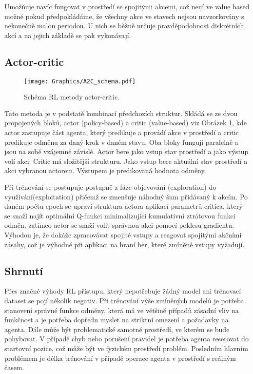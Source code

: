 \documentclass[czech, bc, kky, he, iso690alph]{fasthesis}
\begin{document}
	            Umožňuje navíc fungovat v prostředí se spojitými akcemi, což není ve value based možné pokud předpokládáme, že všechny akce ve stavech nejsou navzorkovány s nekonečně malou periodou. U nich se běžně určuje pravděpodobnost diskrétních akcí a na jejich základě se pak vykonávají.
            
            \subsection{Actor-critic}
            		
            		\begin{figure}[h]
            			\centering
            			\texttt{[image: Graphics/A2C\_schema.pdf]}
            			\caption{Schéma RL metody actor-critic.}
            			\label{pic:actor_critic}
            		\end{figure}
            		
	            Tato metoda je v podstatě kombinací předchozích struktur. Skládá se ze dvou propojených bloků, actor (policy-based) a critic (value-based) viz Obrázek \ref{pic:actor_critic}, kde actor zastupuje část agenta, který predikuje a provádí akce v prostředí a critic predikuje odměnu za daný krok v daném stavu. Oba bloky fungují paralelně a jsou na sobě vzájemně závislé. Actor bere jako vstup stav prostředí a jako výstup volí akci. Critic má složitější strukturu. Jako vstup bere aktuální stav prostředí a akci vybranou actorem. Výstupem je predikovaná hodnota odměny.
	            
	            Při trénování se postupuje postupně z fáze objevování (exploration) do využívání(exploitation) přičemž se zmenšuje náhodný šum přidávaný k akcím. Po daném počtu epoch se upraví struktura actora aplikací parametrů critica, který se snaží najít optimální Q-funkci minimalizující kumulativní ztrátovou funkci odměn, zatímco actor se snaží volit správnou akci pomocí poklesu gradientu. Výhodou je, že dokáže zpracovávat spojité vstupy a reagovat spojitými akčními zásahy, což je výhodné při aplikaci na hraní her, které zmíněné vstupy vyžadují.
	            
        	\subsection{Shrnutí}
        		Přes značné výhody RL přístupu, který nepotřebuje žádný model ani trénovací dataset se pojí několik negativ. Při trénování výše zmíněných modelů je potřeba stanovení správné funkce odměny, která má ve většině případů zásadní vliv na funkčnost a je potřeba dopředu myslet na striktní omezení a požadavky na agenta. Dále může být problematické samotné prostředí, ve kterém se bude pohybovat. V případě chyb nebo porušení pravidel je potřeba agenta resetovat do startovní pozice, což může být ve fyzickém prostředí problém. Posledním hlavním problémem je délka trénování v případě operace agenta v prostředí s reálným časem.
            
\end{document}
